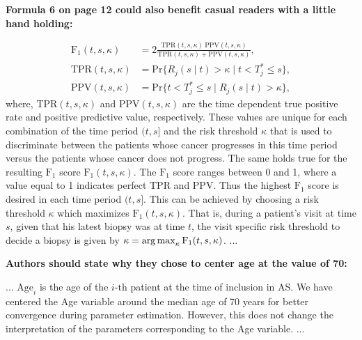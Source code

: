 \begin{enumerate}
    \textbf{Formula 6 on page 12 could also benefit casual readers with a little hand holding:}

    \begin{shadequote}
	\begin{equation}
\label{eq:F1_TPR_PPV}
\begin{split}
\mbox{F}_1(t,  s, \kappa) &= 2\frac{\mbox{TPR}(t,  s, \kappa)\ \mbox{PPV}(t,  s, \kappa)}{\mbox{TPR}(t,  s, \kappa) + \mbox{PPV}(t,  s, \kappa)},\\
\mbox{TPR}(t,  s, \kappa) &= \mbox{Pr}\big\{R_j(s \mid t) > \kappa \mid t < T^*_j \leq s\big\},\\
\mbox{PPV}(t,  s, \kappa) &= \mbox{Pr}\big\{t < T^*_j \leq s \mid R_j(s \mid t) > \kappa \big\},
\end{split}
\end{equation}
where, $\mbox{TPR}(t,  s, \kappa)$ and $\mbox{PPV}(t,  s, \kappa)$ are the time dependent true positive rate and positive predictive value, respectively. These values are unique for each combination of the time period $(t, s]$ and the risk threshold $\kappa$ that is used to discriminate between the patients whose cancer progresses in this time period versus the patients whose cancer does not progress. The same holds true for the resulting $\mbox{F}_1$ score $\mbox{F}_1(t,  s, \kappa)$. The $\mbox{F}_1$ score ranges between 0 and 1, where a value equal to 1 indicates perfect TPR and PPV. Thus the highest $\mbox{F}_1$ score is desired in each time period $(t, s]$. This can be achieved by choosing a risk threshold $\kappa$ which maximizes $\mbox{F}_1(t, s, \kappa)$. That is, during a patient's visit at time $s$, given that his latest biopsy was at time $t$, the visit specific risk threshold to decide a biopsy is given by ${\kappa=\operatorname{arg\,max}_{\kappa} \mbox{F}_1(t, s, \kappa)}$. ...
    \end{shadequote}

    \textbf{Authors should state why they chose to center age at the value of 70:}
    \begin{shadequote}
		... $\mbox{Age}_i$ is the age of the ${i\mbox{-th}}$ patient at the time of inclusion in AS. We have centered the Age variable around the median age of 70 years for better convergence during parameter estimation. However, this does not change the interpretation of the parameters corresponding to the Age variable. ...
	\end{shadequote}
\end{enumerate}